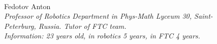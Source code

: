 \begin{figure}[H]
	\begin{minipage}[h]{0.47\linewidth}
		\\
	\end{minipage}
	\hfill
	\begin{minipage}{0.47\linewidth}
		Fedotov Anton \\ 
		\emph{Professor of Robotics Department in Phys-Math Lyceum 30, Saint-Peterburg, Russia. Tutor of FTC team. \\}
		\emph{Information: 23 years old, in robotics 5 years, in FTC 4 years.}
	\end{minipage}	
	\vfill 
	\begin{minipage}[h]{0.47\linewidth}

\end{minipage}
\end{figure}
